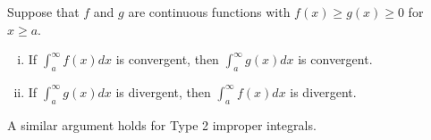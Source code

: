 \documentclass[a4paper,8pt]{article}
\begin{document}
\begin{outline}
    Suppose that \(f\) and \(g\) are continuous functions with \(f(x) \geq g(x) \geq 0\) for \(x \geq a\).
    \begin{enumerate}[i.]
      \item If \(\int_a^{\infty}f(x)dx\) is convergent, then \(\int_a^{\infty}g(x)dx\) is convergent.
      \item If \(\int_a^{\infty}g(x)dx\) is divergent, then \(\int_a^{\infty}f(x)dx\) is divergent.
    \end{enumerate}
    A similar argument holds for Type 2 improper integrals.

\end{outline}
\end{document}
